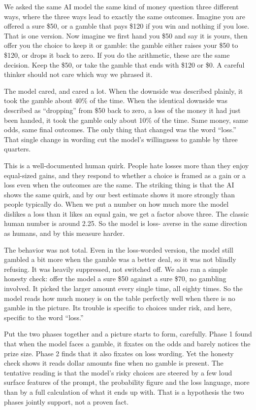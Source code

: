 \documentclass[11pt]{article}
\begin{document}
We asked the same AI model the same kind of money question three different ways, where the three ways
lead to exactly the same outcomes. Imagine you are offered a sure \$50, or a gamble that pays \$120 if
you win and nothing if you lose. That is one version. Now imagine we first hand you \$50 and say it is
yours, then offer you the choice to keep it or gamble: the gamble either raises your \$50 to \$120, or
drops it back to zero. If you do the arithmetic, these are the same decision. Keep the \$50, or take the
gamble that ends with \$120 or \$0. A careful thinker should not care which way we phrased it.

The model cared, and cared a lot. When the downside was described plainly, it took the gamble about
40\% of the time. When the identical downside was described as ``dropping'' from \$50 back to zero, a
loss of the money it had just been handed, it took the gamble only about 10\% of the time. Same money,
same odds, same final outcomes. The only thing that changed was the word ``loss.'' That single change in
wording cut the model's willingness to gamble by three quarters.

This is a well-documented human quirk. People hate losses more than they enjoy equal-sized gains, and
they respond to whether a choice is framed as a gain or a loss even when the outcomes are the same. The
striking thing is that the AI shows the same quirk, and by our best estimate shows it more strongly than
people typically do. When we put a number on how much more the model dislikes a loss than it likes an
equal gain, we get a factor above three. The classic human number is around 2.25. So the model is loss-
averse in the same direction as humans, and by this measure harder.

The behavior was not total. Even in the loss-worded version, the model still gambled a bit more when the
gamble was a better deal, so it was not blindly refusing. It was heavily suppressed, not switched off.
We also ran a simple honesty check: offer the model a sure \$50 against a sure \$70, no gambling
involved. It picked the larger amount every single time, all eighty times. So the model reads how much
money is on the table perfectly well when there is no gamble in the picture. Its trouble is specific to
choices under risk, and here, specific to the word ``loss.''

Put the two phases together and a picture starts to form, carefully. Phase 1 found that when the model
faces a gamble, it fixates on the odds and barely notices the prize size. Phase 2 finds that it also
fixates on loss wording. Yet the honesty check shows it reads dollar amounts fine when no gamble is
present. The tentative reading is that the model's risky choices are steered by a few loud surface
features of the prompt, the probability figure and the loss language, more than by a full calculation of
what it ends up with. That is a hypothesis the two phases jointly support, not a proven fact.
\end{document}
